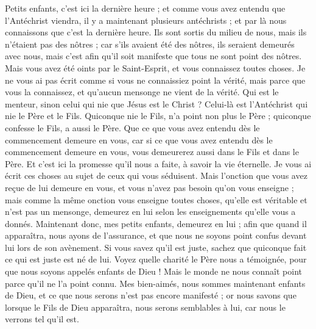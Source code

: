 \begin{multicols}{2}
Petits enfants, c'est ici la dernière heure ; et comme vous avez entendu que l'Antéchrist viendra, il y a maintenant plusieurs antéchrists ; et par là nous connaissons que c'est la dernière heure.
Ils sont sortis du milieu de nous, mais ils n'étaient pas des nôtres ; car s'ils avaient été des nôtres, ils seraient demeurés avec nous, mais c'est afin qu'il soit manifeste que tous ne sont point des nôtres.
Mais vous avez été oints par le Saint-Esprit, et vous connaissez toutes choses.
Je ne vous ai pas écrit comme si vous ne connaissiez point la vérité, mais parce que vous la connaissez, et qu'aucun mensonge ne vient de la vérité.
Qui est le menteur, sinon celui qui nie que Jésus est le Christ ? Celui-là est l'Antéchrist qui nie le Père et le Fils.
Quiconque nie le Fils, n'a point non plus le Père ; quiconque confesse le Fils, a aussi le Père.
Que ce que vous avez entendu dès le commencement demeure en vous, car si ce que vous avez entendu dès le commencement demeure en vous, vous demeurerez aussi dans le Fils et dans le Père.
Et c'est ici la promesse qu'il nous a faite, à savoir la vie éternelle.
Je vous ai écrit ces choses au sujet de ceux qui vous séduisent.
Mais l'onction que vous avez reçue de lui demeure en vous, et vous n'avez pas besoin qu'on vous enseigne ; mais comme la même onction vous enseigne toutes choses, qu'elle est véritable et n'est pas un mensonge, demeurez en lui selon les enseignements qu'elle vous a donnés.
Maintenant donc, mes petits enfants, demeurez en lui ; afin que quand il apparaîtra, nous ayons de l'assurance, et que nous ne soyons point confus devant lui lors de son avènement.
Si vous savez qu'il est juste, sachez que quiconque fait ce qui est juste est né de lui.
\VerseOne{}Voyez quelle charité le Père nous a témoignée, pour que nous soyons appelés enfants de Dieu ! Mais le monde ne nous connaît point parce qu'il ne l'a point connu.
Mes bien-aimés, nous sommes maintenant enfants de Dieu, et ce que nous serons n'est pas encore manifesté ; or nous savons que lorsque le Fils de Dieu apparaîtra, nous serons semblables à lui, car nous le verrons tel qu'il est.

\end{multicols}

